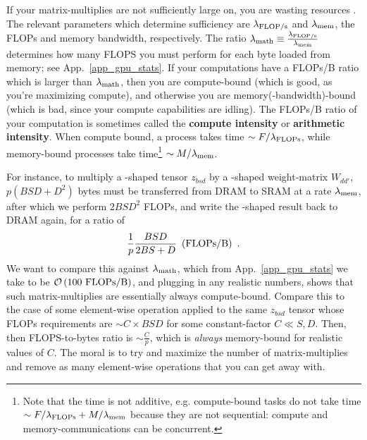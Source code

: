 \documentclass[11pt]{article}
\begin{document}
If your matrix-multiplies are not sufficiently large on,
you are wasting resources \cite{he2022brrrrfromfirstprinciples}. The relevant parameters which
determine sufficiency are $ \lambda _{ {\rm FLOP/s}  } $ and $ \lambda _{ {\rm mem}  } $, the FLOPs
and memory bandwidth, respectively. The ratio $  \lambda _{ {\rm math}  } \equiv \frac{  \lambda _{ {\rm FLOP/s}  } }{ \lambda _{ {\rm mem}  } }   $
determines how many FLOPS you must perform for each byte loaded from memory; see App.~\ref{app_gpu_stats}.
If your computations have a FLOPs/B ratio which is larger than  $ \lambda _{ {\rm math}  } $, then
you are compute-bound (which is good, as you're maximizing compute), and otherwise you are
memory(-bandwidth)-bound (which is bad, since your compute capabilities are idling). The FLOPs/B
ratio of your computation is sometimes called the \textbf{compute intensity} or \textbf{arithmetic
intensity}. When compute bound, a process takes time $ \sim F/\lambda _{ {\rm FLOPs} } $, while
memory-bound processes take time\footnote{Note that the time is not additive, e.g. compute-bound tasks do
not take time $ \sim F/\lambda _{ {\rm FLOPs} } +M/\lambda _{ {\rm mem} }$ because they are not sequential: compute and memory-communications can be concurrent.} $ \sim M/\lambda _{ {\rm mem} } $.


For instance, to multiply a -shaped tensor $ z _{ bsd } $ by a -shaped
weight-matrix $ W _{ d d' } $, $ p \left ( BSD +D ^{ 2 } \right ) $ bytes must be transferred from
DRAM to SRAM at a rate $ \lambda _{ {\rm  mem}  } $, after which we perform $ 2BSD ^{ 2 } $ FLOPs,
and write the -shaped  result back to DRAM again, for a ratio of
\begin{align}
    \frac{ 1 }{ p } \frac{ BSD }{ 2BS + D } \ \left ( {\rm FLOPs/B} \right )  \ .
\end{align}
We want to compare this against $ \lambda _{ {\rm math}  } $, which from
App.~\ref{app_gpu_stats} we take to be $ \mathcal{O} \left( 100\  {\rm FLOPs/B} \right)  $, and plugging
in any realistic numbers, shows that such matrix-multiplies are essentially always compute-bound.
Compare this to the case of some element-wise operation applied to the same $ z _{ bsd } $ tensor
whose FLOPs requirements are $ \sim C\times BSD $ for some constant-factor $ C \ll S, D $.  Then,
then FLOPS-to-bytes ratio is $ \sim \frac{ C }{ p } $, which is \textit{always} memory-bound for
realistic values of $ C $. The moral is to try and maximize the number of matrix-multiplies and
remove as many element-wise operations that you can get away with.
\end{document}
